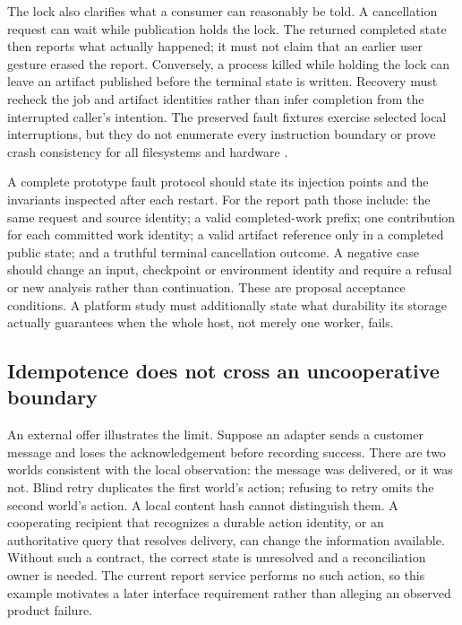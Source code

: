 The lock also clarifies what a consumer can reasonably be told. A cancellation
request can wait while publication holds the lock. The returned completed
state then reports what actually happened; it must not claim that an earlier
user gesture erased the report. Conversely, a process killed while holding
the lock can leave an artifact published before the terminal state is
written. Recovery must recheck the job and artifact identities rather than
infer completion from the interrupted caller's intention. The preserved
fault fixtures exercise selected local interruptions, but they do not
enumerate every instruction boundary or prove crash consistency for all
filesystems and hardware \citep{exec13_ops_faults}.

A complete prototype fault protocol should state its injection points and
the invariants inspected after each restart. For the report path those
include: the same request and source identity; a valid completed-work prefix;
one contribution for each committed work identity; a valid artifact reference
only in a completed public state; and a truthful terminal cancellation
outcome. A negative case should change an input, checkpoint or environment
identity and require a refusal or new analysis rather than continuation.
These are proposal acceptance conditions. A platform study must additionally
state what durability its storage actually guarantees when the whole host,
not merely one worker, fails.

\subsection{Idempotence does not cross an uncooperative boundary}

An external offer illustrates the limit. Suppose an adapter sends a customer
message and loses the acknowledgement before recording success. There are
two worlds consistent with the local observation: the message was delivered,
or it was not. Blind retry duplicates the first world's action; refusing to
retry omits the second world's action. A local content hash cannot distinguish
them. A cooperating recipient that recognizes a durable action identity,
or an authoritative query that resolves delivery, can change the information
available. Without such a contract, the correct state is unresolved and a
reconciliation owner is needed. The current report service performs no such
action, so this example motivates a later interface requirement rather than
alleging an observed product failure.

